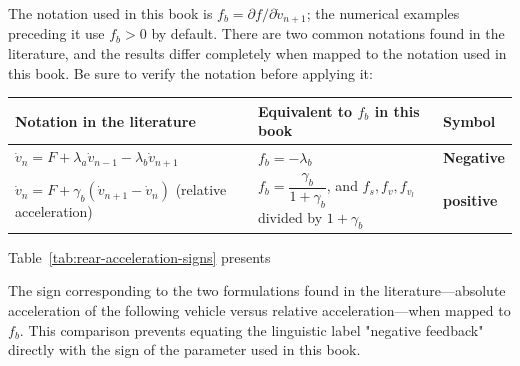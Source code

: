 \documentclass[11pt,a4paper,openany]{book}
\numberwithin{equation}{chapter}
\numberwithin{figure}{chapter}
\numberwithin{table}{chapter}
\newcommand{\tabletext}[2]{%
  \par\smallskip\noindent
  Table~\ref{#1} presents #2
\par\smallskip
}
\begin{document}
The notation used in this book is $f_b = \partial f/\partial\dot v_{n+1}$; the numerical examples preceding it use $f_b>0$ by default. There are two common notations found in the literature, and the results differ completely when mapped to the notation used in this book. Be sure to verify the notation before applying it:










\begin{center}
\label{tab:rear-acceleration-signs}
\begin{tabular}{p{6.4cm}p{4.2cm}p{3.4cm}}
\toprule







Notation in the literature




&




 Equivalent to $f_b$ in this book




&




 Symbol



\\
\midrule
$\dot v_n = F + \lambda_a\dot v_{n-1} - \lambda_b\dot v_{n+1}$ & $f_b = -\lambda_b$ & \textbf{Negative} 
\\[4pt]
$\dot v_n = F + \gamma_b\left(\dot v_{n+1}-\dot v_n\right)$ (relative acceleration)

&

$f_b = \dfrac{\gamma_b}{1+\gamma_b}$, and $f_s,f_v,f_{v_l}$ divided by $1+\gamma_b$

& \textbf{positive} \\
\bottomrule
\end{tabular}
\end{center}
\tabletext{tab:rear-acceleration-signs}{

The sign corresponding to the two formulations found in the literature—absolute acceleration of the following vehicle versus relative acceleration—when mapped to $f_b$. This comparison prevents equating the linguistic label "negative feedback" directly with the sign of the parameter used in this book.
}
\end{document}
